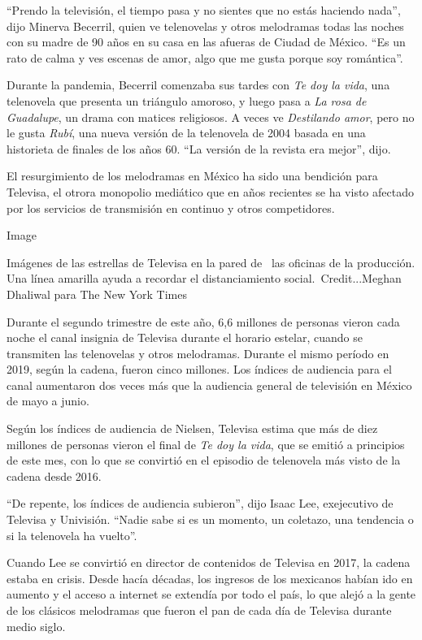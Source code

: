 ``Prendo la televisión, el tiempo pasa y no sientes que no estás
haciendo nada'', dijo Minerva Becerril, quien ve telenovelas y otros
melodramas todas las noches con su madre de 90 años en su casa en las
afueras de Ciudad de México. ``Es un rato de calma y ves escenas de
amor, algo que me gusta porque soy romántica''.

Durante la pandemia, Becerril comenzaba sus tardes con \emph{Te doy la
vida}, una telenovela que presenta un triángulo amoroso, y luego pasa a
\emph{La rosa de Guadalupe}, un drama con matices religiosos. A veces ve
\emph{Destilando amor}, pero no le gusta \emph{Rubí}, una nueva versión
de la telenovela de 2004 basada en una historieta de finales de los años
60. ``La versión de la revista era mejor'', dijo.

El resurgimiento de los melodramas en México ha sido una bendición para
Televisa, el otrora monopolio mediático que en años recientes se ha
visto afectado por los servicios de transmisión en continuo y otros
competidores.

Image

Imágenes de las estrellas de Televisa en la pared de~ las oficinas de la
producción. Una línea amarilla ayuda a recordar el distanciamiento
social.~Credit...Meghan Dhaliwal para The New York Times

Durante el segundo trimestre de este año, 6,6 millones de personas
vieron cada noche el canal insignia de Televisa durante el horario
estelar, cuando se transmiten las telenovelas y otros melodramas.
Durante el mismo período en 2019, según la cadena, fueron cinco
millones. Los índices de audiencia para el canal aumentaron dos veces
más que la audiencia general de televisión en México de mayo a junio.

Según los índices de audiencia de Nielsen, Televisa estima que más de
diez millones de personas vieron el final de \emph{Te doy la vida}, que
se emitió a principios de este mes, con lo que se convirtió en el
episodio de telenovela más visto de la cadena desde 2016.

``De repente, los índices de audiencia subieron'', dijo Isaac Lee,
exejecutivo de Televisa y Univisión. ``Nadie sabe si es un momento, un
coletazo, una tendencia o si la telenovela ha vuelto''.

Cuando Lee se convirtió en director de contenidos de Televisa en 2017,
la cadena estaba en crisis. Desde hacía décadas, los ingresos de los
mexicanos habían ido en aumento y el acceso a internet se extendía por
todo el país, lo que alejó a la gente de los clásicos melodramas que
fueron el pan de cada día de Televisa durante medio siglo.

